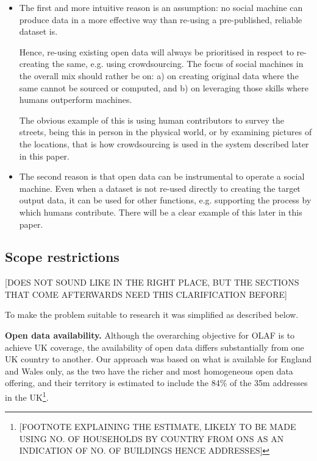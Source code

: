     \begin{itemize}

        \item The first and more intuitive reason is an assumption: no social machine can produce data in a more effective way than re-using a pre-published, reliable dataset is.  
        
        Hence, re-using existing open data will always be prioritised in respect to re-creating the same, e.g. using crowdsourcing. The focus of social machines in the overall mix should rather be on: a) on creating original data where the same cannot be sourced or computed, and b) on leveraging those skills where humans outperform machines. 
        
        The obvious example of this is using human contributors to survey the streets, being this in person in the physical world, or by examining pictures of the locations, that is how crowdsourcing is used in the system described later in this paper.

        \item The second reason is that open data can be instrumental to operate a social machine. Even when a dataset is not re-used directly to creating the target output data, it can be used for other functions, e.g. supporting the process by which humans contribute. There will be a clear example of this later in this paper. 

    \end{itemize}

\subsection{Scope restrictions}
    
    [DOES NOT SOUND LIKE IN THE RIGHT PLACE, BUT THE SECTIONS THAT COME AFTERWARDS NEED THIS CLARIFICATION BEFORE] 
    
    To make the problem suitable to research it was simplified as described below. 
    
    \textbf{Open data availability.} Although the overarching objective for OLAF is to achieve UK coverage, the availability of open data differs substantially from one UK country to another. Our approach was based on what is available for England and Wales only, as the two have the richer and most homogeneous open data offering, and their territory is estimated to include the 84\% of the 35m addresses in the UK\footnote{[FOOTNOTE EXPLAINING THE ESTIMATE, LIKELY TO BE MADE USING NO. OF HOUSEHOLDS BY COUNTRY FROM ONS AS AN INDICATION OF NO. OF BUILDINGS HENCE ADDRESSES]}.
    
